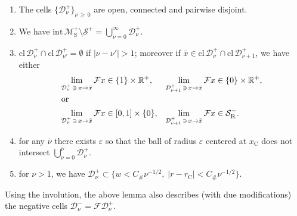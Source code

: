 \documentclass[AHL, Unicode, longabstracts,published]{cedram}
\newcommand{\eps}{\varepsilon}
\newcommand{\ct}{r}
\newcommand{\intr}[1]{\mathrm{int}\,#1}
\newcommand{\crit}{\mathrm{C}}
\newcommand{\ctc}{\ct_\crit}
\newcommand{\xc}{x_\crit}
\newcommand{\reals}{\mathbb{R}}
\newcommand{\cm}{\mathcal{F}}
\newcommand{\cell}{\mathcal{D}}
\newcommand{\csp}{\mathcal{M}}
\newcommand{\csps}{\csp_\text{S}}
\newcommand{\recoPrivate}{\mathrm{R}}
\newcommand{\singPrivate}{\mathcal{S}}
\newcommand{\singReco}{\singPrivate_{\recoPrivate}}
\newcommand{\singForward}[1]{\singPrivate^+_{#1}}
\newcommand{\indCell}{\nu}
\newcommand{\Const}{C_\#}
\newcommand{\clo}{\text{cl}\,}
\newcommand*\DS{\displaystyle}
\newcommand*{\relabel}{\renewcommand{\labelenumi}{(\theenumi)}}
\newcommand*{\alphenumi}{\renewcommand*{\theenumi}{\alph{enumi}}\relabel}
\begin{document}
\begin{lemm}\label{l_singularityStructure}
\leavevmode
\begin{enumerate}\alphenumi
\item \label{i_disjointCells}
The cells $\{\cell^+_\indCell\}_{\indCell\,\ge\,0}$ are open, connected and pairwise disjoint.
\item \label{i_partitionCells}
We have $\DS
\intr\csps^+\setminus\singForward{}=\bigcup_{\indCell=0}^\infty\cell^+_\indCell. $
\item \label{i_adjacentCells}
$\clo\cell^+_\indCell\cap\clo \cell^+_{\indCell'} = \emptyset$ if $|\indCell-\indCell'| > 1$; moreover if $\bar x\in\clo\cell^{+}_{\indCell}\cap\clo\cell^{+}_{\indCell+1}$, we have either
\begin{align*}
\lim_{\cell^{+}_{\indCell}\,\ni\,x\to\bar x}\cm x&\in\{1\}\times\reals^+,&
\lim_{\cell^{+}_{\indCell+1}\,\ni\,x\to\bar x}\cm x&\in\{0\}\times\reals^+,
\\
\intertext{or}
\lim_{\cell^{+}_{\indCell}\,\ni\,x\to\bar x}\cm x&\in[0,1]\times\{0\},&
\lim_{\cell^{+}_{\indCell+1}\,\ni\,x\to\bar x}\cm x&\in\singReco^{-}.
\end{align*}
\item for any $\bar\indCell$ there exists $\eps$ so that the ball of radius $\eps$ centered at $\xc$ does not intersect $\bigcup_{\indCell = 0}^{\bar\indCell} \cell^+_\indCell$.
\item \label{i_boundedCells}
for $\indCell > 1$, we have $\cell^{+}_{\indCell}\subset\{w < \Const \indCell^{-1/2},\; |\ct-\ctc|< \Const \indCell^{-1/2} \}$.
\end{enumerate}
\end{lemm}

\begin{rema}\label{r_singularityStructureBackwards}
Using the involution, the above lemma also describes (with due modifications) the negative cells $\cell^-_\indCell = \cm\cell^+_\indCell$.
\end{rema}
\end{document}
